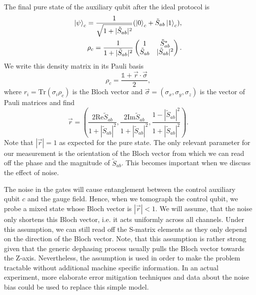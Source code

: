 \documentclass[two column]{article}
\begin{document}
The final pure state of the auxiliary qubit after the ideal protocol is
\begin{equation}
\begin{split}
    \ket{\psi}_c = \frac{1}{\sqrt{1+|\tilde{S}_{ab}|^2}}(\ket{0}_c + \tilde{S}_{ab}\ket{1}_c),\\
    \rho_c = \frac{1}{1+|\tilde{S}_{ab}|^2}\begin{pmatrix}
    1 & \tilde{S}_{ab}^* \\
    \tilde{S}_{ab} & |\tilde{S}_{ab}|^2
    \end{pmatrix}.
\end{split}
\end{equation}
We write this density matrix in its Pauli basis 
\begin{equation}
    \rho_c = \frac{\mathbb{1} + \vec{r} \cdot \vec{\sigma}}{2},
\end{equation}
where  $r_i = \text{Tr}(\sigma_i\rho_c)$ is the Bloch vector and $\vec{\sigma} = (\sigma_x, \sigma_y, \sigma_z)$ is the vector of Pauli matrices and find
\begin{equation}
    \vec{r} = \left( \frac{2 \text{Re}\tilde{S}_{ab}}{1+|\tilde{S}_{ab}|^2}, \frac{2 \text{Im}\tilde{S}_{ab}}{1+|\tilde{S}_{ab}|^2}, \frac{1 - |\tilde{S}_{ab}|^2}{1+|\tilde{S}_{ab}|^2} \right).\label{eqn:bloch}
\end{equation}
Note that $|\vec{r}| = 1$ as expected for the pure state. The only relevant parameter for our measurement is the orientation of the Bloch vector from which we can read off the phase and the magnitude of $\tilde S_{ab}$. This becomes important when we discuss the effect of noise.

The noise in the gates will cause entanglement between the control auxiliary qubit $c$ and the gauge field. Hence, when we tomograph the control qubit, we probe a mixed state whose Bloch vector is $|\vec{r}|< 1$. We will assume, that the noise only shortens this Bloch vector, i.e. it acts uniformly across all channels. Under this assumption, we can still read off the S-matrix elements as they only depend on the direction of the Bloch vector. Note, that this assumption is rather strong given that the generic dephasing process usually pulls the Bloch vector towards the Z-axis. Nevertheless, the assumption is used in order to make the problem tractable without additional machine specific information. In an actual experiment, more elaborate error mitigation techniques and data about the noise bias could be used to replace this simple model.
\end{document}
